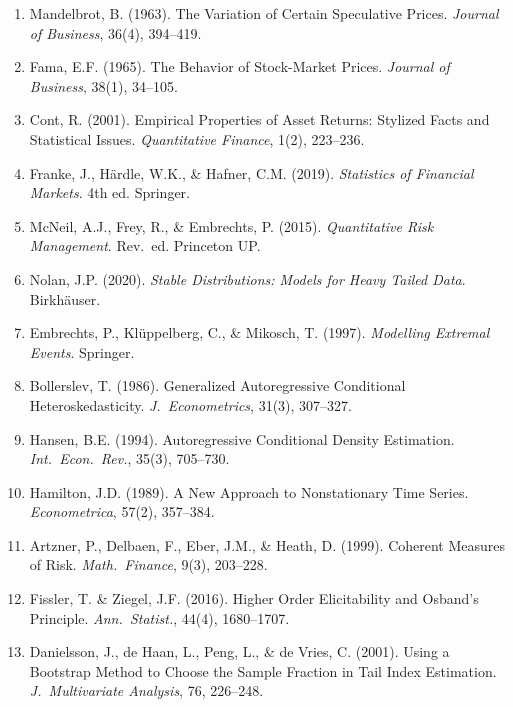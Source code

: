 \documentclass[11pt, a4paper]{article}
\theoremstyle{definition}
\begin{document}
\begin{enumerate}
  \item Mandelbrot, B. (1963). The Variation of Certain Speculative Prices. \textit{Journal of Business}, 36(4), 394--419.
  \item Fama, E.F. (1965). The Behavior of Stock-Market Prices. \textit{Journal of Business}, 38(1), 34--105.
  \item Cont, R. (2001). Empirical Properties of Asset Returns: Stylized Facts and Statistical Issues. \textit{Quantitative Finance}, 1(2), 223--236.
  \item Franke, J., Härdle, W.K., \& Hafner, C.M. (2019). \textit{Statistics of Financial Markets}. 4th ed. Springer.
  \item McNeil, A.J., Frey, R., \& Embrechts, P. (2015). \textit{Quantitative Risk Management}. Rev.\ ed. Princeton UP.
  \item Nolan, J.P. (2020). \textit{Stable Distributions: Models for Heavy Tailed Data}. Birkhäuser.
  \item Embrechts, P., Klüppelberg, C., \& Mikosch, T. (1997). \textit{Modelling Extremal Events}. Springer.
  \item Bollerslev, T. (1986). Generalized Autoregressive Conditional Heteroskedasticity. \textit{J.\ Econometrics}, 31(3), 307--327.
  \item Hansen, B.E. (1994). Autoregressive Conditional Density Estimation. \textit{Int.\ Econ.\ Rev.}, 35(3), 705--730.
  \item Hamilton, J.D. (1989). A New Approach to Nonstationary Time Series. \textit{Econometrica}, 57(2), 357--384.
  \item Artzner, P., Delbaen, F., Eber, J.M., \& Heath, D. (1999). Coherent Measures of Risk. \textit{Math.\ Finance}, 9(3), 203--228.
  \item Fissler, T. \& Ziegel, J.F. (2016). Higher Order Elicitability and Osband's Principle. \textit{Ann.\ Statist.}, 44(4), 1680--1707.
  \item Danielsson, J., de Haan, L., Peng, L., \& de Vries, C. (2001). Using a Bootstrap Method to Choose the Sample Fraction in Tail Index Estimation. \textit{J.\ Multivariate Analysis}, 76, 226--248.
\end{enumerate}
\end{document}
